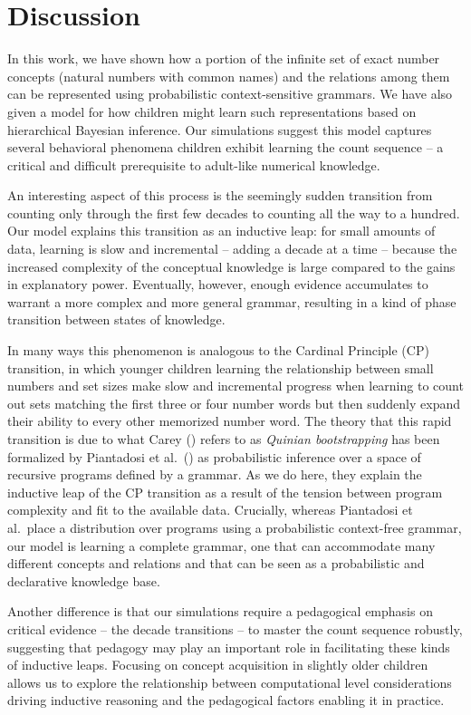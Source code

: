 \documentclass[10pt,letterpaper]{article}
\begin{document}
\section{Discussion}

In this work, we have shown how a portion of the infinite set of exact
number concepts (natural numbers with common names) and the relations
among them can be represented using probabilistic context-sensitive
grammars. We have also given a model for how children might learn such
representations based on hierarchical Bayesian inference. Our
simulations suggest this model captures several behavioral phenomena
children exhibit learning the count sequence -- a critical and
difficult prerequisite to adult-like numerical knowledge.

An interesting aspect of this process is the seemingly sudden
transition from counting only through the first few decades to
counting all the way to a hundred. Our model explains this transition
as an inductive leap: for small amounts of data, learning is slow and
incremental -- adding a decade at a time -- because the increased
complexity of the conceptual knowledge is large compared to the gains
in explanatory power. Eventually, however, enough evidence accumulates
to warrant a more complex and more general grammar, resulting
in a kind of phase transition between states of knowledge.

In many ways this phenomenon is analogous to the Cardinal Principle
(CP) transition, in which younger children learning the relationship
between small numbers and set sizes make slow and incremental progress
when learning to count out sets matching the first three or four
number words but then suddenly expand their ability to every other
memorized number word. The theory that this rapid transition is due to
what Carey (\citeyear{Car2009}) refers to as \emph{Quinian
  bootstrapping} has been formalized by Piantadosi et
al.~(\citeyear{PianGoodTen2012}) as probabilistic inference over a
space of recursive programs defined by a grammar. As we do here, they
explain the inductive leap of the CP transition as a result of the
tension between program complexity and fit to the available data.
Crucially, whereas Piantadosi et al.~place a distribution over
programs using a probabilistic context-free grammar, our model is
learning a complete grammar, one that can accommodate many different
concepts and relations and that can be seen as a probabilistic and
declarative knowledge base.

Another difference is that our simulations require a pedagogical
emphasis on critical evidence -- the decade transitions -- to master
the count sequence robustly, suggesting that pedagogy may play an
important role in facilitating these kinds of inductive leaps.
Focusing on concept acquisition in slightly older children allows us
to explore the relationship between computational level considerations
driving inductive reasoning and the pedagogical factors enabling it in
practice.
\end{document}
